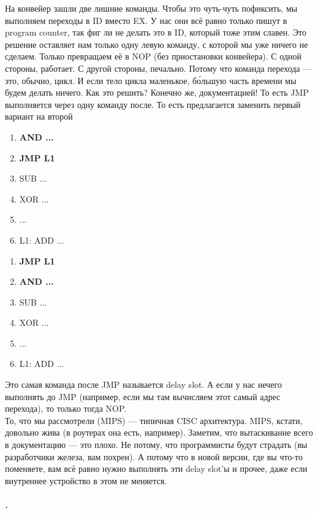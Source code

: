 \documentclass{article}
\begin{document}
    На конвейер зашли две лишние команды. Чтобы это чуть-чуть пофиксить, мы выполняем переходы в ID вместо EX. У нас они всё равно только пишут в program counter, так фиг ли не делать это в ID, который тоже этим славен. Это решение оставляет нам только одну левую команду, с которой мы уже ничего не сделаем. Только превращаем её в NOP (без приостановки конвейера). С одной стороны, работает. С другой стороны, печально. Потому что команда перехода --- это, обычно, цикл. И если тело цикла маленькое, б\'{о}льшую часть времени мы будем делать ничего. Как это решить? Конечно же, документацией! То есть JMP выполняется через одну команду после. То есть предлагается заменить первый вариант на второй
    \begin{multicols}{2}
        \begin{enumerate}[1.]
            \item \textbf{AND ...}
            \item \textbf{JMP L1}
            \item SUB ...
            \item XOR ...
            \item ...
            \item L1: ADD ...
        \end{enumerate}
        \columnbreak
        \begin{enumerate}[1.]
            \item \textbf{JMP L1}
            \item \textbf{AND ...}
            \item SUB ...
            \item XOR ...
            \item ...
            \item L1: ADD ...
        \end{enumerate}
    \end{multicols}
    Это самая команда после JMP называется delay slot. А если у нас нечего выполнять до JMP (например, если мы там вычисляем этот самый адрес перехода), то только тогда NOP.\\
    То, что мы рассмотрели (MIPS) --- типичная CISC архитектура. MIPS, кстати, довольно жива (в роутерах она есть, например). Заметим, что вытаскивание всего в документацию --- это плохо. Не потому, что программисты будут страдать (вы разработчики железа, вам похрен). А потому что в новой версии, где вы что-то поменяете, вам всё равно нужно выполнять эти delay slot'ы и прочее, даже если внутреннее устройство в этом не меняется.
    \subparagraph{.}
\end{document}
